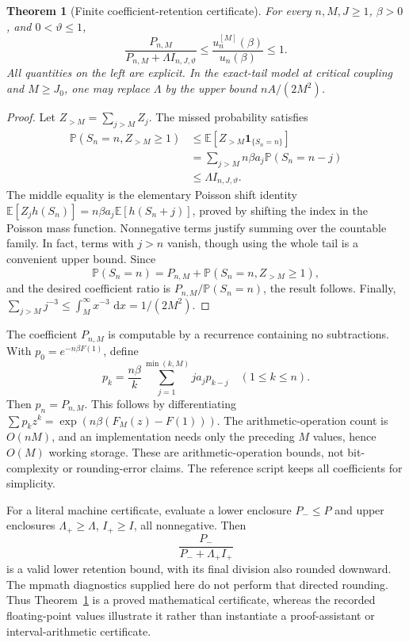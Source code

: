 \documentclass[11pt,a4paper]{article}
\numberwithin{equation}{section}
\newtheorem{theorem}{Theorem}[section]
\theoremstyle{definition}
\theoremstyle{remark}
\newcommand{\E}{\mathbb E}
\newcommand{\Prob}{\mathbb P}
\newcommand{\dd}{\,\mathrm d}
\begin{document}
\begin{theorem}[Finite coefficient-retention certificate]
\label{thm:finite-certificate}
For every \(n,M,J\ge1\), \(\beta>0\), and \(0<\vartheta\le1\),
\begin{equation}
 \boxed{\quad
 \frac{P_{n,M}}{P_{n,M}+\Lambda I_{n,J,\vartheta}}
 \le\frac{u_n^{[M]}(\beta)}{u_n(\beta)}\le1.
 \quad}
 \label{eq:finite-certificate}
\end{equation}
All quantities on the left are explicit. In the exact-tail model at
critical coupling and \(M\ge J_0\), one may replace \(\Lambda\) by the
upper bound \(nA/(2M^2)\).
\end{theorem}
\begin{proof}
Let \(Z_{>M}=\sum_{j>M}Z_j\). The missed probability satisfies
\begin{align*}
 \Prob(S_n=n,Z_{>M}\ge1)
 &\le\E[Z_{>M}\mathbf1_{\{S_n=n\}}]\\
 &=\sum_{j>M}n\beta a_j\Prob(S_n=n-j)\\
 &\le\Lambda I_{n,J,\vartheta}.
\end{align*}
The middle equality is the elementary Poisson shift identity
\(\E[Z_jh(S_n)]=n\beta a_j\E[h(S_n+j)]\), proved by shifting the index
in the Poisson mass function. Nonnegative terms justify summing over the
countable family. In fact, terms with \(j>n\) vanish, though using the
whole tail is a convenient upper bound. Since
\[
 \Prob(S_n=n)=P_{n,M}+\Prob(S_n=n,Z_{>M}\ge1),
\]
and the desired coefficient ratio is \(P_{n,M}/\Prob(S_n=n)\), the result
follows. Finally,
\(\sum_{j>M}j^{-3}\le\int_M^\infty x^{-3}\,\dd x=1/(2M^2)\).
\end{proof}

The coefficient \(P_{n,M}\) is computable by a recurrence containing no
subtractions. With \(p_0=e^{-n\beta F(1)}\), define
\begin{equation}
 p_k=\frac{n\beta}{k}
 \sum_{j=1}^{\min(k,M)}j a_j p_{k-j}\quad(1\le k\le n).
 \label{eq:positive-recurrence}
\end{equation}
Then \(p_n=P_{n,M}\). This follows by differentiating
\(\sum p_kz^k=\exp(n\beta(F_M(z)-F(1)))\).
The arithmetic-operation count is \(O(nM)\), and an implementation needs
only the preceding \(M\) values, hence \(O(M)\) working storage.
These are arithmetic-operation bounds, not bit-complexity or rounding-error
claims. The reference script keeps all coefficients for simplicity.

For a literal machine certificate, evaluate a lower enclosure \(P_-\le P\)
and upper enclosures \(\Lambda_+\ge\Lambda\), \(I_+\ge I\), all nonnegative.
Then
\[
 \frac{P_-}{P_-+\Lambda_+I_+}
\]
is a valid lower retention bound, with its final division also rounded
downward. The mpmath diagnostics supplied here do not perform that directed
rounding. Thus Theorem~\ref{thm:finite-certificate} is a proved mathematical
certificate, whereas the recorded floating-point values illustrate it rather
than instantiate a proof-assistant or interval-arithmetic certificate.
\end{document}
